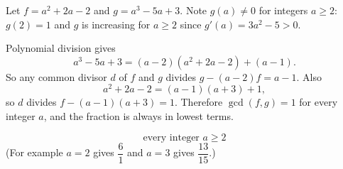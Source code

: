 Let \(f=a^2+2a-2\) and \(g=a^3-5a+3\). Note \(g(a)\ne 0\) for integers \(a\ge2\): \(g(2)=1\) and \(g\) is increasing for \(a\ge2\) since \(g'(a)=3a^2-5>0\).

Polynomial division gives
\[
a^3-5a+3=(a-2)(a^2+2a-2)+(a-1).
\]
So any common divisor \(d\) of \(f\) and \(g\) divides \(g-(a-2)f=a-1\). Also
\[
a^2+2a-2=(a-1)(a+3)+1,
\]
so \(d\) divides \(f-(a-1)(a+3)=1\). Therefore \(\gcd(f,g)=1\) for every integer \(a\), and the fraction is always in lowest terms.

\[
\boxed{\text{every integer } a\ge 2}
\]
(For example \(a=2\) gives \(\dfrac{6}{1}\) and \(a=3\) gives \(\dfrac{13}{15}\).)
